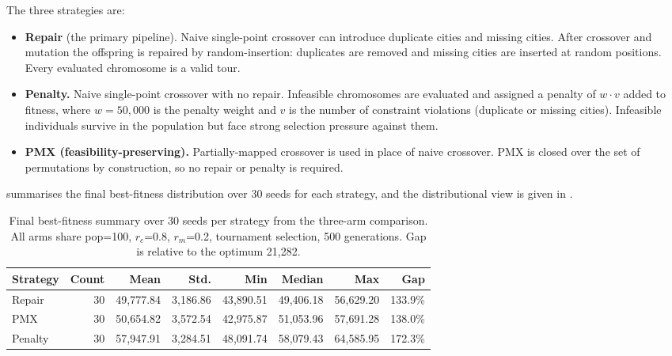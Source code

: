 The three strategies are:
\begin{itemize}
    \item \textbf{Repair} (the primary pipeline). Naive single-point crossover
    can introduce duplicate cities and missing cities. After crossover and
    mutation the offspring is repaired by random-insertion: duplicates are
    removed and missing cities are inserted at random positions. Every
    evaluated chromosome is a valid tour.
    \item \textbf{Penalty.} Naive single-point crossover with no repair.
    Infeasible chromosomes are evaluated and assigned a penalty of
    $w \cdot v$ added to fitness, where $w = 50{,}000$ is the
    penalty weight and $v$ is the number of constraint violations
    (duplicate or missing cities). Infeasible individuals survive in the
    population but face strong selection pressure against them.
    \item \textbf{PMX (feasibility-preserving).} Partially-mapped crossover
    is used in place of naive crossover. PMX is closed over the set of
    permutations by construction, so no repair or penalty is required.
\end{itemize}

 summarises the final best-fitness distribution
over 30 seeds for each strategy, and the distributional view is given in
.

\begin{table}[htbp]
    \centering
    \caption{Final best-fitness summary over 30 seeds per strategy from the three-arm comparison. All arms share pop=100, $r_c$=0.8, $r_m$=0.2, tournament selection, 500 generations. Gap is relative to the optimum 21,282.}
    \label{tab:repair-summary}
    \begin{tabular}{l r r r r r r r}
        \hline
        Strategy & Count & Mean & Std. & Min & Median & Max & Gap \\
        \hline
        Repair  & 30 & 49{,}777.84 & 3{,}186.86 & 43{,}890.51 & 49{,}406.18 & 56{,}629.20 & 133.9\% \\
        PMX     & 30 & 50{,}654.82 & 3{,}572.54 & 42{,}975.87 & 51{,}053.96 & 57{,}691.28 & 138.0\% \\
        Penalty & 30 & 57{,}947.91 & 3{,}284.51 & 48{,}091.74 & 58{,}079.43 & 64{,}585.95 & 172.3\% \\
        \hline
    \end{tabular}
\end{table}

